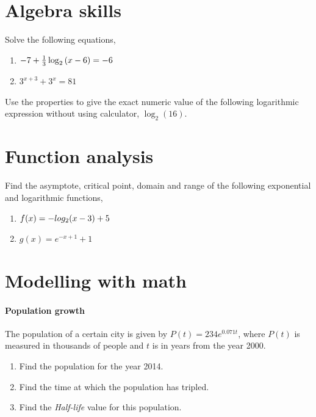 \documentclass{tufte-handout} %
\begin{document}
\section{Algebra skills}

Solve the following equations,
\begin{enumerate}
    \item $-7+\frac{1}{3}\log_{2}\qty(x-6)=-6$
    \item $3^{x+3}+3^x=81$
\end{enumerate}

Use the properties to give the exact numeric value of the following logarithmic expression without using calculator, $\log_{2}(16)$.



\section{Function analysis}

Find the asymptote, critical point, domain and range of the following exponential and logarithmic functions,
\begin{enumerate}
    \item $f(x)=-log_{2}\qty(x-3)+5$
    \item $g(x)=e^{-x+1}+1$
\end{enumerate}

\section{Modelling with math}

\paragraph{Population growth} The population of a certain city is given by $P(t)=234e^{0.071 t}$, where $P(t)$ is measured in thousands of people and $t$ is in years from the year 2000.

\begin{enumerate}
    \item Find the population for the year \num{2014}.
    \item Find the time at which the population has tripled.
    \item Find the \emph{Half-life} value for this population.
\end{enumerate}

\newpage
\end{document}
